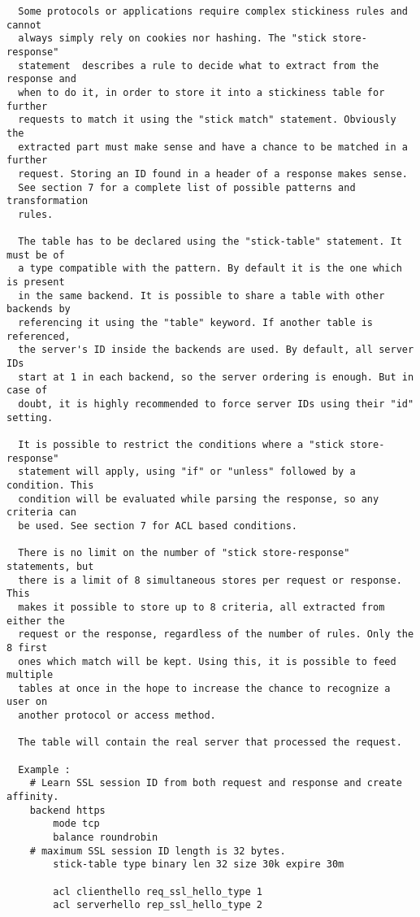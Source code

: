\begin{verbatim}
  Some protocols or applications require complex stickiness rules and cannot
  always simply rely on cookies nor hashing. The "stick store-response"
  statement  describes a rule to decide what to extract from the response and
  when to do it, in order to store it into a stickiness table for further
  requests to match it using the "stick match" statement. Obviously the
  extracted part must make sense and have a chance to be matched in a further
  request. Storing an ID found in a header of a response makes sense. 
  See section 7 for a complete list of possible patterns and transformation
  rules.

  The table has to be declared using the "stick-table" statement. It must be of
  a type compatible with the pattern. By default it is the one which is present
  in the same backend. It is possible to share a table with other backends by
  referencing it using the "table" keyword. If another table is referenced,
  the server's ID inside the backends are used. By default, all server IDs
  start at 1 in each backend, so the server ordering is enough. But in case of
  doubt, it is highly recommended to force server IDs using their "id" setting.

  It is possible to restrict the conditions where a "stick store-response"
  statement will apply, using "if" or "unless" followed by a condition. This
  condition will be evaluated while parsing the response, so any criteria can
  be used. See section 7 for ACL based conditions.

  There is no limit on the number of "stick store-response" statements, but
  there is a limit of 8 simultaneous stores per request or response. This
  makes it possible to store up to 8 criteria, all extracted from either the
  request or the response, regardless of the number of rules. Only the 8 first
  ones which match will be kept. Using this, it is possible to feed multiple
  tables at once in the hope to increase the chance to recognize a user on
  another protocol or access method.

  The table will contain the real server that processed the request.

  Example :
    # Learn SSL session ID from both request and response and create affinity.
    backend https
        mode tcp
        balance roundrobin
	# maximum SSL session ID length is 32 bytes.
        stick-table type binary len 32 size 30k expire 30m
        
        acl clienthello req_ssl_hello_type 1
        acl serverhello rep_ssl_hello_type 2


\end{verbatim}

